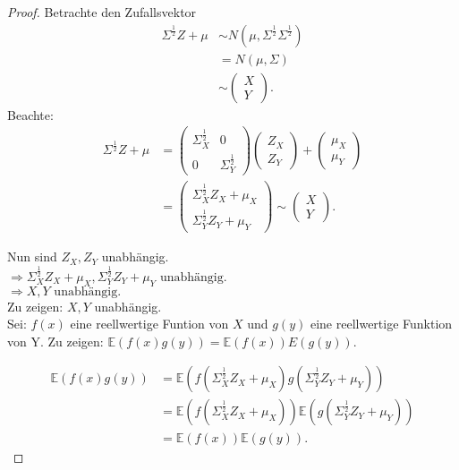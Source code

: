 \documentclass{tstextbook}
\newcommand{\E}{\mathbb E}
\begin{document}
\begin{proof}
Betrachte den Zufallsvektor 
	\begin{align*}
	 \Sigma^{\frac{1}{2}} Z + \mu & \sim N\left(\mu , \Sigma^{\frac{1}{2}} \Sigma^{\frac{1}{2}} \right) \\ 
	& = 
	N\left(\mu , \Sigma \right) \\
	& \sim 
	\begin{pmatrix}
		X \\ Y
	\end{pmatrix}. 
\end{align*}
	Beachte:
	\begin{align*}
		\Sigma^{\frac{1}{2}} Z + \mu & = \begin{pmatrix}
			\Sigma_X^{\frac{1}{2}} & 0 \\
			0 & \Sigma_Y^{\frac{1}{2}}
		\end{pmatrix} \begin{pmatrix} Z_X \\ Z_Y \end{pmatrix} + \begin{pmatrix} \mu_X \\ \mu_Y \end{pmatrix}\\
	& = \begin{pmatrix}
		\Sigma_X^{\frac{1}{2}} Z_X + \mu_X \\
		\Sigma_Y^{\frac{1}{2}} Z_Y + \mu_Y
	\end{pmatrix} \sim \begin{pmatrix}
	X \\ Y \end{pmatrix}.
	\end{align*}

Nun sind $ Z_X, Z_Y $ unabhängig. \\
$ \Rightarrow \Sigma_X^{\frac{1}{2}} Z_X + \mu_X, \Sigma_Y^{\frac{1}{2}} Z_Y + \mu_Y \text{ unabhängig}. $ \\
$ \Rightarrow X,Y \text{ unabhängig}. $ \\
Zu zeigen: $ X, Y $ unabhängig. \\
Sei: $ f(x) $ eine reellwertige Funtion von $ X $ und $ g(y) $ eine reellwertige Funktion von Y.
Zu zeigen: $ \E(f(x)g(y)) = \E(f(x))E(g(y)). $

\begin{align*} \mathbb{E}(f(x)g(y)) & = \mathbb{E}\left( f\left( \Sigma_X^{\frac{1}{2}} Z_X + \mu_X \right)g\left( \Sigma_Y^{\frac{1}{2}} Z_Y + \mu_Y \right) \right) \\
	& = \mathbb{E}\left( f\left( \Sigma_X^{\frac{1}{2}} Z_X + \mu_X \right)\right) \mathbb{E}\left( g\left( \Sigma_Y^{\frac{1}{2}} Z_Y + \mu_Y \right)\right) \\
	& = \mathbb{E}(f(x)) \mathbb{E}(g(y)).
\end{align*}
\end{proof}
\end{document}
